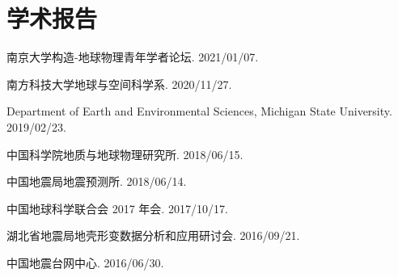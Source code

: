 \section{学术报告}

\begin{etaremune}
\item
	南京大学构造-地球物理青年学者论坛.
	2021/01/07.
\item
	南方科技大学地球与空间科学系.
	2020/11/27.
	\invited
\item
    Department of Earth and Environmental Sciences, Michigan State University.
    2019/02/23.
\item
	中国科学院地质与地球物理研究所.
	2018/06/15.
	\invited
\item
	中国地震局地震预测所.
	2018/06/14.
\item
	中国地球科学联合会 2017 年会.
	2017/10/17.
	\invited
\item
	湖北省地震局地壳形变数据分析和应用研讨会.
	2016/09/21.
	\invited
\item
	中国地震台网中心.
	2016/06/30.
	\invited
\end{etaremune}

